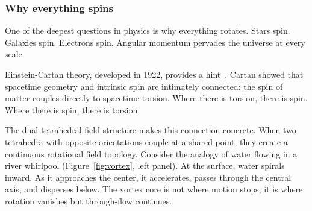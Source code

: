 \documentclass[aps,prd,preprint,superscriptaddress,showpacs,preprintnumbers,amsmath,amssymb,nofootinbib]{revtex4-2}
\begin{document}
\subsubsection*{Why everything spins}

One of the deepest questions in physics is why everything rotates. Stars spin. Galaxies spin. Electrons spin. Angular momentum pervades the universe at every scale.

Einstein-Cartan theory, developed in 1922, provides a hint~\cite{hehl1976}. Cartan showed that spacetime geometry and intrinsic spin are intimately connected: the spin of matter couples directly to spacetime torsion. Where there is torsion, there is spin. Where there is spin, there is torsion.

The dual tetrahedral field structure makes this connection concrete. When two tetrahedra with opposite orientations couple at a shared point, they create a continuous rotational field topology. Consider the analogy of water flowing in a river whirlpool (Figure~\ref{fig:vortex}, left panel). At the surface, water spirals inward. As it approaches the center, it accelerates, passes through the central axis, and disperses below. The vortex core is not where motion stops; it is where rotation vanishes but through-flow continues.
\end{document}
